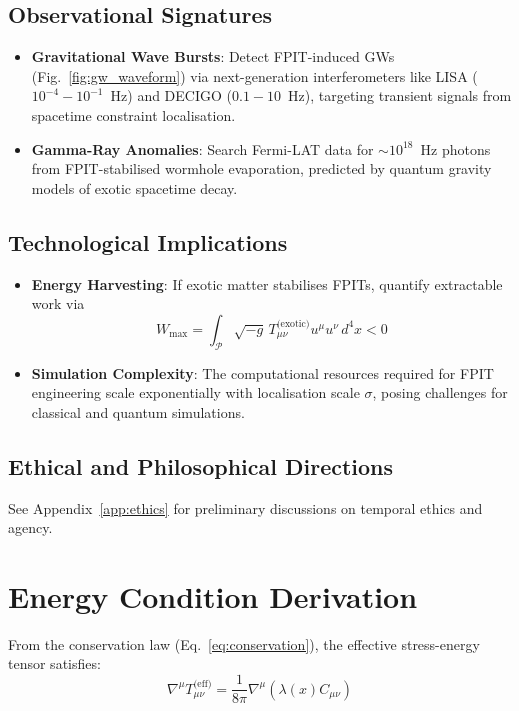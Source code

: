 \documentclass[twocolumn]{article}
\newcommand{\fpit}{\mathcal{P}}
\newcommand{\lagrange}{\lambda(x)}
\begin{document}
	\subsection{Observational Signatures}
	\begin{itemize}
		\item \textbf{Gravitational Wave Bursts}: Detect FPIT-induced GWs (Fig.~\ref{fig:gw_waveform}) via next-generation interferometers like LISA ($10^{-4} - 10^{-1}$~Hz)\cite{lisa2023} and DECIGO ($0.1 - 10$~Hz)\cite{kawamura2021}, targeting transient signals from spacetime constraint localisation.
		
		\item \textbf{Gamma-Ray Anomalies}: Search Fermi-LAT data for $\sim 10^{18}$~Hz photons from FPIT-stabilised wormhole evaporation, predicted by quantum gravity models of exotic spacetime decay\cite{Hochberg1997}.
	\end{itemize}
	
	\subsection{Technological Implications}
	\begin{itemize}
		\item \textbf{Energy Harvesting}: If exotic matter stabilises FPITs, quantify extractable work via  
		\begin{equation}
			W_{\text{max}} = \int_\fpit \sqrt{-g} \, T_{\mu\nu}^{\text{(exotic)}} u^\mu u^\nu \, d^4x < 0
		\end{equation}
		\item \textbf{Simulation Complexity}: The computational resources required for FPIT engineering scale exponentially with localisation scale $\sigma$, posing challenges for classical and quantum simulations.
	\end{itemize}
	
	\subsection{Ethical and Philosophical Directions}
	See Appendix~\ref{app:ethics} for preliminary discussions on temporal ethics and agency.
	
	\appendix
	\FloatBarrier%
	\section{Energy Condition Derivation}\label{app:energy}
	
	From the conservation law (Eq.~\ref{eq:conservation}), the effective stress-energy tensor satisfies:
	\begin{equation}
		\nabla^\mu T_{\mu\nu}^{\text{(eff)}} = \frac{1}{8\pi}\nabla^\mu(\lagrange C_{\mu\nu})
	\end{equation}
	
\end{document}
